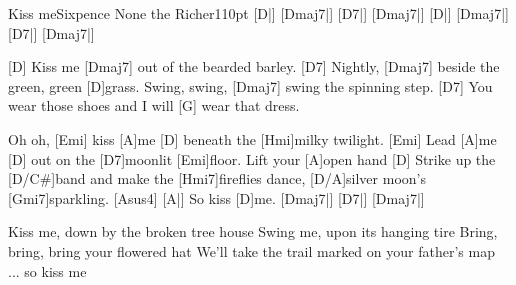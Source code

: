 \begin{song}{Kiss me}{Sixpence None the Richer}{110pt}
\verse{*}%
[D|]{} [Dmaj7|]{} [D7|]{} [Dmaj7|]{}
[D|]{} [Dmaj7|]{} [D7|]{} [Dmaj7|]{}

%
[D]{} Kiss me [Dmaj7]{} out of the bearded barley.
[D7]{} Nightly, [Dmaj7]{} beside the green, green [D]grass.
Swing, swing, [Dmaj7]{} swing the spinning step.
[D7]{} You wear those shoes and I will [G]{} wear that dress.

\chorus%
Oh oh, [Emi]{} kiss [A]me [D]{} beneath the [Hmi]milky twilight.
[Emi]{} Lead  [A]me [D]{} out on the [D7]moonlit [Emi]{floor}.
Lift your [A]open hand
[D]{} Strike up the [D/C#]band and make the [Hmi7]fireflies dance,
[D/A]silver moon's [Gmi7]sparkling. [Asus4]{}
[A|]{} So kiss [D]me. [Dmaj7|]{} [D7|]{} [Dmaj7|]{}

%
Kiss me, down by the broken tree house
Swing me, upon its hanging tire
Bring, bring,  bring your flowered hat
We'll take the trail marked on your father's map
\repchor\ 
... \rl so kiss me

\end{song}
